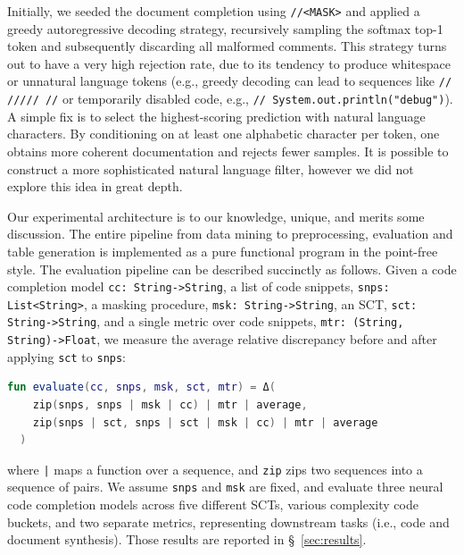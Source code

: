 \documentclass[usenames,dvipsnames]{article} %
\begin{document}
  Initially, we seeded the document completion using \lstinline|//<MASK>| and applied a greedy autoregressive decoding strategy, recursively sampling the softmax top-1 token and subsequently discarding all malformed comments. This strategy turns out to have a very high rejection rate, due to its tendency to produce whitespace or unnatural language tokens (e.g., greedy decoding can lead to sequences like \lstinline|// ///// //| or temporarily disabled code, e.g., \lstinline|// System.out.println("debug")|). A simple fix is to select the highest-scoring prediction with natural language characters. By conditioning on at least one alphabetic character per token, one obtains more coherent documentation and rejects fewer samples. It is possible to construct a more sophisticated natural language filter, however we did not explore this idea in great depth.

  Our experimental architecture is to our knowledge, unique, and merits some discussion. The entire pipeline from data mining to preprocessing, evaluation and table generation is implemented as a pure functional program in the point-free style. The evaluation pipeline can be described succinctly as follows. Given a code completion model \lstinline|cc: String->String|, a list of code snippets, \lstinline|snps: List<String>|, a masking procedure, \lstinline|msk: String->String|, an SCT, \lstinline|sct: String->String|, and a single metric over code snippets, \lstinline|mtr: (String, String)->Float|, we measure the average relative discrepancy before and after applying \lstinline|sct| to \lstinline|snps|:

  \noindent\begin{lstlisting}[basicstyle=\footnotesize\ttfamily, language=kotlin,label={lst:lstlisting}]
  fun evaluate(cc, snps, msk, sct, mtr) = Δ(
    zip(snps, snps | msk | cc) | mtr | average,
    zip(snps | sct, snps | sct | msk | cc) | mtr | average
  )
  \end{lstlisting}

  \noindent where \texttt{|} maps a function over a sequence, and \lstinline|zip| zips two sequences into a sequence of pairs. We assume \lstinline|snps| and \lstinline|msk| are fixed, and evaluate three neural code completion models across five different SCTs, various complexity code buckets, and two separate metrics, representing downstream tasks (i.e., code and document synthesis). Those results are reported in \S~\ref{sec:results}.
\end{document}
